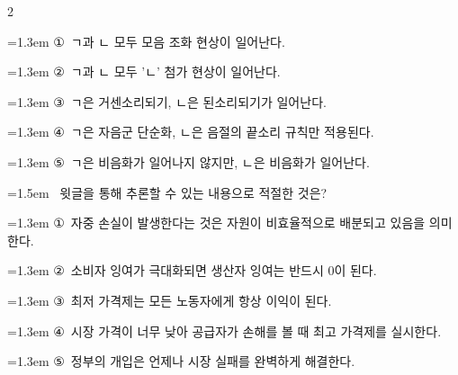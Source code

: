 \documentclass[10pt, a4paper]{article}
\begin{document}
\begin{multicols}{2}
\begin{minipage}{\columnwidth}
\vspace{0.5mm}
{\hangindent=1.3em  \noindent\hspace{0.3em}①~ㄱ과 ㄴ 모두 모음 조화 현상이 일어난다.\par}
{\hangindent=1.3em  \noindent\hspace{0.3em}②~ㄱ과 ㄴ 모두 'ㄴ' 첨가 현상이 일어난다.\par}
{\hangindent=1.3em  \noindent\hspace{0.3em}③~ㄱ은 거센소리되기, ㄴ은 된소리되기가 일어난다.\par}
{\hangindent=1.3em  \noindent\hspace{0.3em}④~ㄱ은 자음군 단순화, ㄴ은 음절의 끝소리 규칙만 적용된다.\par}
{\hangindent=1.3em  \noindent\hspace{0.3em}⑤~ㄱ은 비음화가 일어나지 않지만, ㄴ은 비음화가 일어난다.\par}
\vspace{4mm}
\end{minipage}
\par

\noindent\begin{minipage}{\columnwidth}
\vspace{2mm}
{\hangindent=1.5em  ~윗글을 통해 추론할 수 있는 내용으로 적절한 것은?\par}

\vspace{0.5mm}
{\hangindent=1.3em  \noindent\hspace{0.3em}①~자중 손실이 발생한다는 것은 자원이 비효율적으로 배분되고 있음을 의미한다.\par}
{\hangindent=1.3em  \noindent\hspace{0.3em}②~소비자 잉여가 극대화되면 생산자 잉여는 반드시 0이 된다.\par}
{\hangindent=1.3em  \noindent\hspace{0.3em}③~최저 가격제는 모든 노동자에게 항상 이익이 된다.\par}
{\hangindent=1.3em  \noindent\hspace{0.3em}④~시장 가격이 너무 낮아 공급자가 손해를 볼 때 최고 가격제를 실시한다.\par}
{\hangindent=1.3em  \noindent\hspace{0.3em}⑤~정부의 개입은 언제나 시장 실패를 완벽하게 해결한다.\par}
\vspace{4mm}
\end{minipage}
\par


\end{multicols}
\end{document}
